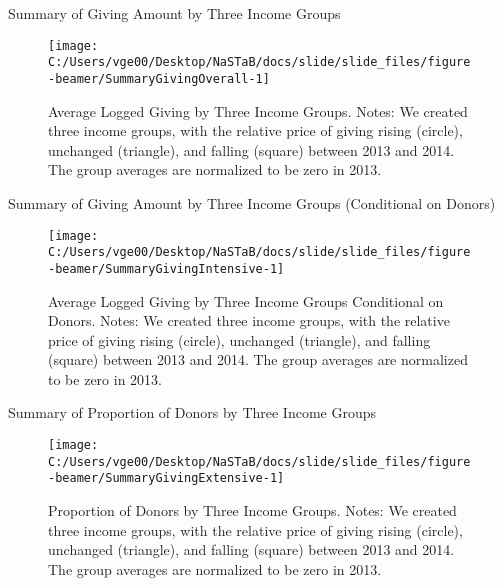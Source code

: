 \documentclass[
  ignorenonframetext,
  aspectratio=169,
]{beamer}
\begin{document}
\begin{frame}{Summary of Giving Amount by Three Income Groups}
\protect\hypertarget{summary-of-giving-amount-by-three-income-groups}{}
\begin{figure}[t]

{\centering \texttt{[image: C:/Users/vge00/Desktop/NaSTaB/docs/slide/slide\_files/figure-beamer/SummaryGivingOverall-1]} 

}

\caption{Average Logged Giving by Three Income Groups. Notes: We created three income groups, with the relative price of giving rising (circle), unchanged (triangle), and falling (square) between 2013 and 2014. The group averages are normalized to be zero in 2013.}\label{fig:SummaryGivingOverall}
\end{figure}
\end{frame}

\begin{frame}{Summary of Giving Amount by Three Income Groups (Conditional on Donors)}
\protect\hypertarget{summary-of-giving-amount-by-three-income-groups-conditional-on-donors}{}
\begin{figure}[t]

{\centering \texttt{[image: C:/Users/vge00/Desktop/NaSTaB/docs/slide/slide\_files/figure-beamer/SummaryGivingIntensive-1]} 

}

\caption{Average Logged Giving by Three Income Groups Conditional on Donors. Notes: We created three income groups, with the relative price of giving rising (circle), unchanged (triangle), and falling (square) between 2013 and 2014. The group averages are normalized to be zero in 2013.}\label{fig:SummaryGivingIntensive}
\end{figure}
\end{frame}

\begin{frame}{Summary of Proportion of Donors by Three Income Groups}
\protect\hypertarget{summary-of-proportion-of-donors-by-three-income-groups}{}
\begin{figure}[t]

{\centering \texttt{[image: C:/Users/vge00/Desktop/NaSTaB/docs/slide/slide\_files/figure-beamer/SummaryGivingExtensive-1]} 

}

\caption{Proportion of Donors by Three Income Groups. Notes: We created three income groups, with the relative price of giving rising (circle), unchanged (triangle), and falling (square) between 2013 and 2014. The group averages are normalized to be zero in 2013.}\label{fig:SummaryGivingExtensive}
\end{figure}
\end{frame}
\end{document}
